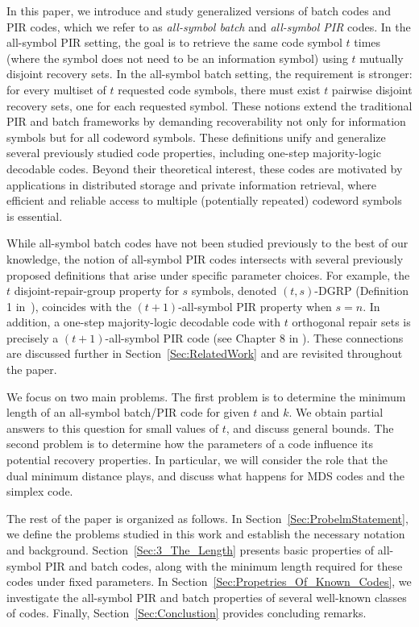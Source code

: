 \documentclass[11pt,a4paper]{article}
\theoremstyle{definition}
\begin{document}
In this paper, we introduce and study generalized versions of batch codes and PIR codes, which we refer to as \emph{all-symbol batch} and \emph{all-symbol PIR} codes. In the all-symbol PIR setting, the goal is to retrieve the same code symbol $t$ times (where the symbol does not need to be an information symbol) using $t$ mutually disjoint recovery sets. In the all-symbol batch setting, the requirement is stronger: for every multiset of $t$ requested code symbols, there must exist $t$ pairwise disjoint recovery sets, one for each requested symbol. These notions extend the traditional PIR and batch frameworks by demanding recoverability not only for information symbols but for all codeword symbols. These definitions unify and generalize several previously studied code properties, including one-step majority-logic decodable codes. Beyond their theoretical interest, these codes are motivated by applications in distributed storage and private information retrieval, where efficient and reliable access to multiple (potentially repeated) codeword symbols is essential.

While all-symbol batch codes have not been studied previously to the best of our knowledge, the notion of all-symbol PIR codes intersects with several previously proposed definitions that arise under specific parameter choices. For example, the $t$ disjoint-repair-group property for $s$ symbols, denoted $(t,s)$-DGRP (Definition 1 in~\cite{KARINGULA_VARDY_WOOTTERS2022}), coincides with the $(t+1)$-all-symbol PIR property when $s = n$. In addition, a one-step majority-logic decodable code with $t$ orthogonal repair sets is precisely a $(t+1)$-all-symbol PIR code (see Chapter 8 in \cite{lin2001error}). These connections are discussed further in Section~\ref{Sec:RelatedWork} and are revisited throughout the paper. 

We focus on two main problems. The first problem is to determine the minimum length of an all-symbol batch/PIR code for given $t$ and $k$. We obtain partial answers to this question for small values of $t$, and discuss general bounds. The second problem is to determine how the parameters of a code influence its potential recovery properties. In particular, we will consider the role that the dual minimum distance plays, and discuss what happens for MDS codes and the simplex code.

The rest of the paper is organized as follows. In 
Section~\ref{Sec:ProbelmStatement}, we define the problems 
studied in this work and establish the necessary notation 
and background. Section~\ref{Sec:3_The_Length} presents 
basic properties of all-symbol PIR and batch codes, 
along with the minimum length required for these codes 
under fixed parameters. In Section~\ref{Sec:Propetries_Of_Known_Codes}, 
we investigate the all-symbol PIR and batch properties of 
several well-known classes of codes. Finally, 
Section~\ref{Sec:Conclustion} provides concluding remarks.
\end{document}
